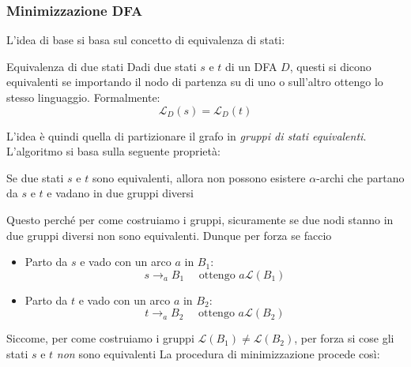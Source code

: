 \subsubsection{Minimizzazione DFA}
L'idea di base si basa sul concetto di equivalenza di stati:
\begin{definizione}{Equivalenza di due stati}
	Dadi due stati $ s $ e $ t $ di un DFA $ D $, questi si dicono equivalenti se importando il nodo di partenza su di uno o sull'altro ottengo lo  stesso linguaggio. Formalmente:
	\[
		\mathcal{L}_D \left(s\right) =     \mathcal{L}_D \left(t\right)
	\]
\end{definizione}
L'idea è quindi quella di partizionare il grafo in \textit{gruppi di stati equivalenti}. L'algoritmo si basa sulla seguente proprietà:
\begin{center}
	Se due stati $ s $ e $ t $ sono equivalenti, allora non possono esistere $ \alpha $-archi che partano da $ s $ e $ t $ e vadano in due gruppi diversi
\end{center}
Questo perché per come costruiamo i gruppi, sicuramente se due nodi stanno in due gruppi diversi non sono equivalenti. Dunque per forza se faccio
\begin{itemize}
	\item Parto da $ s $ e vado con un arco $ a $ in $ B_1 $:
	      \[
		      s \rightarrow_a B_1 \quad \text{ ottengo } a \mathcal{L}\left(B_1\right)
	      \]
	\item Parto da $ t $ e vado con un arco $ a $ in $ B_2 $:
	      \[
		      t \rightarrow_a B_2 \quad \text{ ottengo } a \mathcal{L}\left(B_2\right)
	      \]
\end{itemize}
Siccome, per come costruiamo i gruppi $ \mathcal{L}\left(B_1\right) \neq \mathcal{L}\left(B_2\right) $, per forza si cose gli stati $ s $ e $ t $ \textit{non} sono equivalenti
La procedura di minimizzazione procede così:
